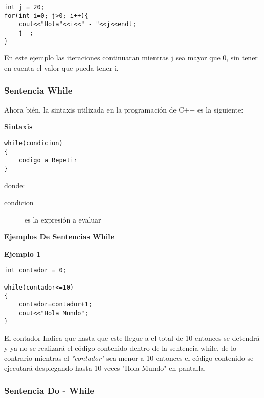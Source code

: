 \begin{lstlisting}[style=Cpp, label=for-ejemplo-3, caption=For Ejemplo 3]
int j = 20;
for(int i=0; j>0; i++){
    cout<<"Hola"<<i<<" - "<<j<<endl;
    j--;
}
\end{lstlisting}

En este ejemplo las iteraciones continuaran mientras j sea mayor que 0, sin tener en cuenta el valor que pueda tener i.


\subsubsection{Sentencia While}

Ahora bién, la sintaxis utilizada en la programación de C++ es la siguiente:

\begin{center}
	\textbf{Sintaxis}
\end{center}

\begin{lstlisting}[style=Cpp, label=sintaxis-while, caption=Sintaxis While]
while(condicion)
{
    codigo a Repetir
}
\end{lstlisting}

donde:

\begin{description}
\item [condicion] es la expresión a evaluar
\end{description}

\begin{center}
	\textbf{Ejemplos De Sentencias While}
\end{center}

\textbf{Ejemplo 1}

\begin{lstlisting}[style=Cpp, label=while-ejemplo-1, caption=While Ejemplo 1]
int contador = 0;
 
while(contador<=10)
{
    contador=contador+1;
    cout<<"Hola Mundo";
}
\end{lstlisting}

El contador Indica que hasta que este llegue a el total de 10 entonces se detendrá y ya no se realizará el código contenido dentro de la sentencia while, de lo contrario mientras el \textit{"contador"} sea menor a 10 entonces el código contenido se ejecutará desplegando hasta 10 veces "Hola Mundo" en pantalla.


\subsubsection{Sentencia Do - While}

